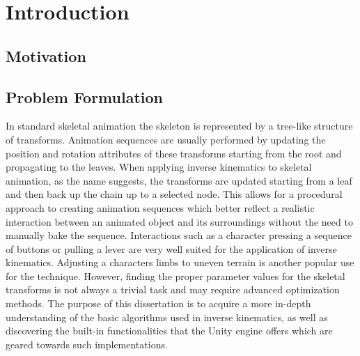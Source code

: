 \chapter{Introduction}
\section{Motivation}
\section{Problem Formulation}
In standard skeletal animation the skeleton is represented by a tree-like
structure of transforms. Animation sequences are usually performed by updating
the position and rotation attributes of these transforms starting from the root
and propagating to the leaves. When applying inverse kinematics to skeletal
animation, as the name suggests, the transforms are updated starting from a leaf
and then back up the chain up to a selected node. This allows for a procedural
approach to creating animation sequences which better reflect a realistic
interaction between an animated object and its surroundings without the need to
manually bake the sequence. Interactions such as a character pressing a sequence
of buttons or pulling a lever are very well suited for the application of inverse
kinematics. Adjusting a characters limbs to uneven terrain is another popular
use for the technique. However, finding the proper parameter values for the
skeletal transforms is not always a trivial task and may require advanced
optimization methods. The purpose of this dissertation is to acquire a more
in-depth understanding of the basic algorithms used in inverse kinematics, as
well as discovering the built-in functionalities that the Unity engine offers
which are geared towards such implementations.
